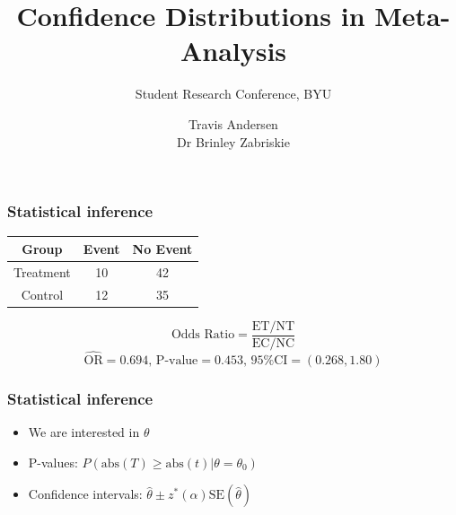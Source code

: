 \documentclass{beamer}
\title{Confidence Distributions in Meta-Analysis}
\subtitle{Student Research Conference, BYU}
\author{Travis Andersen \\ Dr Brinley Zabriskie}
\begin{document}
\begin{frame}
  \maketitle
\end{frame}

\begin{frame}
  \frametitle{Statistical inference}
  \begin{table}
  \begin{tabular}{| c | c | c |} \hline
    Group & Event & No Event \\ \hline
    Treatment & 10 & 42 \\ \hline
    Control & 12 & 35 \\ \hline
  \end{tabular}
  \end{table}
  \begin{equation*}
    \text{Odds Ratio} = \frac{\text{ET}/\text{NT}}{\text{EC}/\text{NC}}
  \end{equation*}
  \begin{equation*}
    \hat{\text{OR}} = 0.694, \, 
    \text{P-value} = 0.453, \,
    \text{95\% CI} = (0.268, 1.80)
  \end{equation*}
\end{frame}

\begin{frame}
  \frametitle{Statistical inference}
  \begin{itemize}
    \item We are interested in $\theta$
    \item P-values: $P(\text{abs}(T) \geq \text{abs}(t)|\theta = \theta_0)$
    \item Confidence intervals: $\hat{\theta} \pm z^*(\alpha) \text{SE}(\hat{\theta})$
  \end{itemize}
\end{frame}
\end{document}
